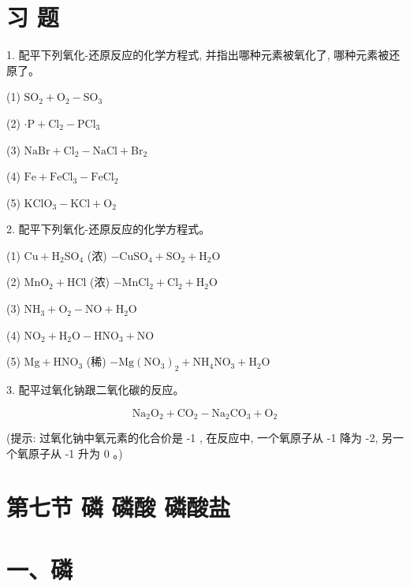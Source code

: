 \documentclass[10pt]{article}
\begin{document}
\section*{习 题}

1. 配平下列氧化-还原反应的化学方程式, 并指出哪种元素被氧化了, 哪种元素被还原了。

(1) \({\mathrm{{SO}}}_{2} + {\mathrm{O}}_{2} - {\mathrm{{SO}}}_{3}\)

(2) \(\cdot \mathrm{P} + {\mathrm{{Cl}}}_{2} - {\mathrm{{PCl}}}_{3}\)

(3) \(\mathrm{{NaBr}} + {\mathrm{{Cl}}}_{2} - \mathrm{{NaCl}} + {\mathrm{{Br}}}_{2}\)

(4) \(\mathrm{{Fe}} + {\mathrm{{FeCl}}}_{3} - {\mathrm{{FeCl}}}_{2}\)

(5) \({\mathrm{{KClO}}}_{3} - \mathrm{{KCl}} + {\mathrm{O}}_{2}\)

2. 配平下列氧化-还原反应的化学方程式。

(1) \(\mathrm{{Cu}} + {\mathrm{H}}_{2}{\mathrm{{SO}}}_{4}\) (浓) \(- {\mathrm{{CuSO}}}_{4} + {\mathrm{{SO}}}_{2} + {\mathrm{H}}_{2}\mathrm{O}\)

(2) \({\mathrm{{MnO}}}_{2} + \mathrm{{HCl}}\) (浓) \(- {\mathrm{{MnCl}}}_{2} + {\mathrm{{Cl}}}_{2} + {\mathrm{H}}_{2}\mathrm{O}\)

(3) \({\mathrm{{NH}}}_{3} + {\mathrm{O}}_{2} - \mathrm{{NO}} + {\mathrm{H}}_{2}\mathrm{O}\)

(4) \({\mathrm{{NO}}}_{2} + {\mathrm{H}}_{2}\mathrm{O} - {\mathrm{{HNO}}}_{3} + \mathrm{{NO}}\)

(5) \(\mathrm{{Mg}} + {\mathrm{{HNO}}}_{3}\) (稀) \(- \mathrm{{Mg}}{\left( {\mathrm{{NO}}}_{3}\right) }_{2} + {\mathrm{{NH}}}_{4}{\mathrm{{NO}}}_{3} + {\mathrm{H}}_{2}\mathrm{O}\)

3. 配平过氧化钠跟二氧化碳的反应。

\[
{\mathrm{{Na}}}_{2}{\mathrm{O}}_{2} + {\mathrm{{CO}}}_{2} - {\mathrm{{Na}}}_{2}{\mathrm{{CO}}}_{3} + {\mathrm{O}}_{2}
\]

(提示: 过氧化钠中氧元素的化合价是 -1 , 在反应中, 一个氧原子从 -1 降为 -2, 另一个氧原子从 -1 升为 0 。)

\section*{第七节 磷 磷酸 磷酸盐}

\section*{一、磷}
\end{document}
